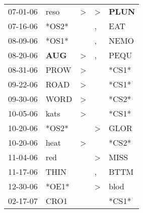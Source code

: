 \begin{supertabular}{p{0.07\textwidth}p{0.06\textwidth}p{0.02\textwidth}p{0.02\textwidth}p{0.06\textwidth}}
          07-01-06\textsuperscript{} &           reso\textsuperscript{} &     \textgreater &     \textgreater &  \textbf{PLUN\textsuperscript{}} \\
          07-16-06\textsuperscript{} &                            *OS2* &                  &                , &            EAT\textsuperscript{} \\
          08-09-06\textsuperscript{} &                            *OS1* &                  &                , &           NEMO\textsuperscript{} \\
          08-20-06\textsuperscript{} &   \textbf{AUG\textsuperscript{}} &     \textgreater &                , &           PEQU\textsuperscript{} \\
          08-31-06\textsuperscript{} &           PROW\textsuperscript{} &     \textgreater &                  &                            *CS1* \\
          09-22-06\textsuperscript{} &           ROAD\textsuperscript{} &     \textgreater &                  &                            *CS1* \\
          09-30-06\textsuperscript{} &           WORD\textsuperscript{} &     \textgreater &                  &                            *CS2* \\
          10-05-06\textsuperscript{} &           kats\textsuperscript{} &     \textgreater &                  &                            *CS1* \\
          10-20-06\textsuperscript{} &                            *OS2* &                  &     \textgreater &           GLOR\textsuperscript{} \\
          10-20-06\textsuperscript{} &           heat\textsuperscript{} &     \textgreater &                  &                            *CS2* \\
          11-04-06\textsuperscript{} &            red\textsuperscript{} &                  &     \textgreater &           MISS\textsuperscript{} \\
          11-17-06\textsuperscript{} &           THIN\textsuperscript{} &                  &                , &           BTTM\textsuperscript{} \\
          12-30-06\textsuperscript{} &                            *OE1* &                  &     \textgreater &           blod\textsuperscript{} \\
          02-17-07\textsuperscript{} &           CRO1\textsuperscript{} &                  &                  &                            *CS1* \\

\end{supertabular}
